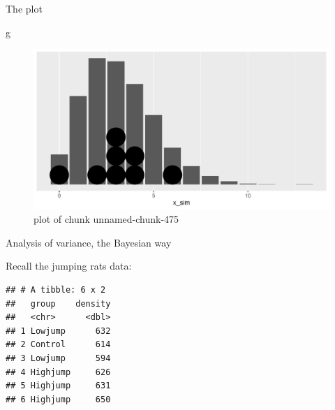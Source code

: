 \documentclass[
  ignorenonframetext,
]{beamer}
\newenvironment{Shaded}{\begin{snugshade}}{\end{snugshade}}
\newcommand{\CommentTok}[1]{\textcolor[rgb]{0.56,0.35,0.01}{\textit{#1}}}
\newcommand{\DecValTok}[1]{\textcolor[rgb]{0.00,0.00,0.81}{#1}}
\newcommand{\KeywordTok}[1]{\textcolor[rgb]{0.13,0.29,0.53}{\textbf{#1}}}
\newcommand{\NormalTok}[1]{#1}
\newcommand{\OperatorTok}[1]{\textcolor[rgb]{0.81,0.36,0.00}{\textbf{#1}}}
\newcommand{\StringTok}[1]{\textcolor[rgb]{0.31,0.60,0.02}{#1}}
\begin{document}
\begin{frame}[fragile]{The plot}
\protect\hypertarget{the-plot-8}{}

\begin{Shaded}
\begin{Highlighting}[]
\NormalTok{g}
\end{Highlighting}
\end{Shaded}

\begin{figure}
\centering
\includegraphics{figure/unnamed-chunk-475-1.pdf}
\caption{plot of chunk unnamed-chunk-475}
\end{figure}

\end{frame}

\begin{frame}[fragile]{Analysis of variance, the Bayesian way}
\protect\hypertarget{analysis-of-variance-the-bayesian-way}{}

Recall the jumping rats data:

\begin{Shaded}
\end{Shaded}

\begin{verbatim}
## # A tibble: 6 x 2
##   group    density
##   <chr>      <dbl>
## 1 Lowjump      632
## 2 Control      614
## 3 Lowjump      594
## 4 Highjump     626
## 5 Highjump     631
## 6 Highjump     650
\end{verbatim}

\end{frame}
\end{document}
